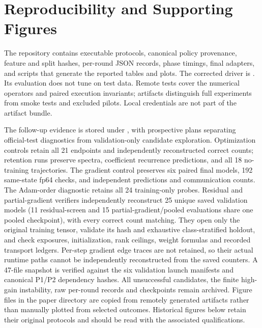 \documentclass[11pt]{article}
\begin{document}
\appendix
\section{Reproducibility and Supporting Figures}
The repository contains executable protocols, canonical policy provenance, feature and split hashes, per-round JSON records, phase timings, final adapters, and scripts that generate the reported tables and plots. The corrected driver is . Its evaluation does not tune on test data. Remote tests cover the numerical operators and paired execution invariants; artifacts distinguish full experiments from smoke tests and excluded pilots. Local credentials are not part of the artifact bundle.

The follow-up evidence is stored under , with prospective plans separating official-test diagnostics from validation-only candidate exploration. Optimization controls retain all 21 endpoints and independently reconstructed correct counts; retention runs preserve spectra, coefficient recurrence predictions, and all 18 no-training trajectories. The gradient control preserves six paired final models, 192 same-state fp64 checks, and independent predictions and communication counts. The Adam-order diagnostic retains all 24 training-only probes. Residual and partial-gradient verifiers independently reconstruct 25 unique saved validation models (11 residual-screen and 15 partial-gradient/pooled evaluations share one pooled checkpoint), with every correct count matching. They open only the original training tensor, validate its hash and exhaustive class-stratified holdout, and check exposures, initialization, rank ceilings, weight formulas and recorded transport ledgers. Per-step gradient edge traces are not retained, so their actual runtime paths cannot be independently reconstructed from the saved counters. A 47-file snapshot is verified against the six validation launch manifests and canonical P1/P2 dependency hashes. All unsuccessful candidates, the finite high-gain instability, raw per-round records and checkpoints remain archived. Figure files in the paper directory are copied from remotely generated artifacts rather than manually plotted from selected outcomes. Historical figures below retain their original protocols and should be read with the associated qualifications.
\end{document}
